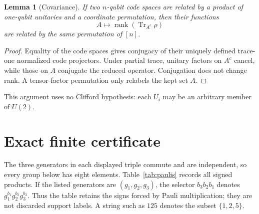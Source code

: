 \documentclass[11pt]{article}
\newtheorem{lemma}{Lemma}
\DeclareMathOperator{\rank}{rank}
\DeclareMathOperator{\Tr}{Tr}
\begin{document}
\begin{lemma}[Covariance]\label{lem:covariance}
If two $n$-qubit code spaces are related by a product of one-qubit
unitaries and a coordinate permutation, then their functions
\[
 A\longmapsto\rank\!\left(\Tr_{A^c}\rho\right)
\]
are related by the same permutation of $[n]$.
\end{lemma}

\begin{proof}
Equality of the code spaces gives conjugacy of their uniquely defined
trace-one normalized code projectors.  Under partial trace, unitary factors
on $A^c$ cancel, while those on $A$ conjugate the reduced operator.
Conjugation does not change rank.  A tensor-factor permutation only relabels
the kept set $A$.
\end{proof}

This argument uses no Clifford hypothesis: each $U_i$ may be an arbitrary
member of $U(2)$.

\section{Exact finite certificate}

The three generators in each displayed triple commute and are independent,
so every group below has eight elements.  Table~\ref{tab:paulis} records
all signed products.  If the listed generators are $(g_1,g_2,g_3)$, the
selector $b_3b_2b_1$ denotes $g_1^{b_1}g_2^{b_2}g_3^{b_3}$.  Thus the
table retains the signs forced by Pauli multiplication; they are not
discarded support labels.  A string such as $125$ denotes the subset
$\{1,2,5\}$.
\end{document}
